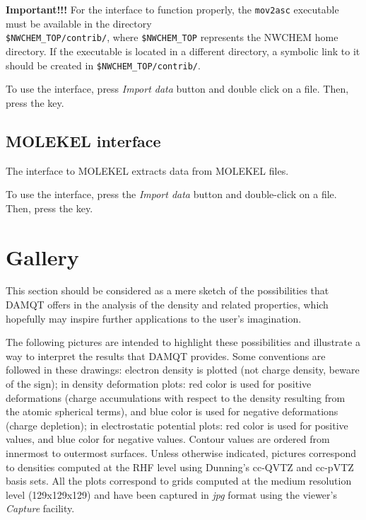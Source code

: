 \documentclass[10pt]{article}
\begin{document}
{\bf Important!!!} For the interface to function properly, the \texttt{mov2asc} executable must be available in
the directory \\ \texttt{\$NWCHEM\_TOP/contrib/}, where \texttt{\$NWCHEM\_TOP} represents
the NWCHEM home directory. If the executable is located in a different directory,
a symbolic link to it should be created in \texttt{\$NWCHEM\_TOP/contrib/}.


To use the interface, press {\it Import data} button \teclapuntos and double click
on a \nwcout{ } file. Then, press the \exec key.

\subsection{MOLEKEL interface \label{sec:5.7}}

The interface to MOLEKEL extracts data from MOLEKEL \mkl{ } files.

To use the interface, press the {\it Import data} button \teclapuntos and double-click
on a \mkl{ } file. Then, press the \exec key.




\newpage

\section{Gallery \label{sec:6}}

This section should be considered as a mere sketch of the possibilities that
DAMQT offers in the analysis of the density and related properties, which hopefully may inspire
further applications to the user's imagination.

The following pictures are intended to highlight these possibilities and illustrate a way to interpret the results that DAMQT provides. Some
conventions are followed in these drawings: electron density is plotted (not
charge density, beware of the sign); in density deformation plots:
red color is used for positive deformations (charge accumulations with respect 
to the density resulting from the atomic spherical terms), and blue color is
used for negative deformations (charge depletion); in electrostatic potential plots:
red color is used for positive values, and blue color for negative values.
Contour values are ordered from innermost to outermost surfaces.
Unless otherwise indicated, pictures correspond to densities computed
at the RHF level using Dunning's cc-QVTZ and cc-pVTZ
basis sets\footnotemark{}.
All the plots correspond to grids computed at the medium resolution level
(129x129x129) and have been captured in {\it jpg} format using the viewer’s {\it
Capture} facility.
\end{document}
